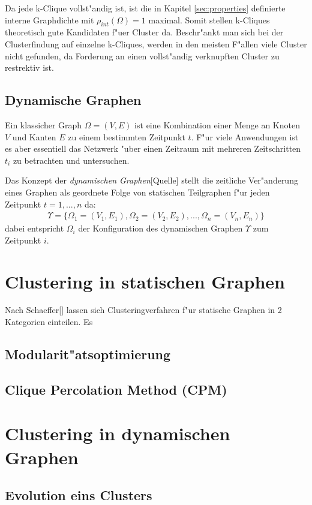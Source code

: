 \documentclass[journal]{vgtc}
\begin{document}
  	
  	Da jede k-Clique vollst"andig ist, ist die in Kapitel \ref{sec:properties} definierte
  	interne Graphdichte mit $\rho_{int}(\Omega)=1$ maximal. Somit stellen k-Cliques theoretisch gute 
  	Kandidaten f"uer Cluster da. Beschr"ankt man sich bei der Clusterfindung auf einzelne k-Cliques,
  	werden in den meisten F"allen viele Cluster nicht gefunden, da Forderung an einen vollst"andig
  	verknupften Cluster zu restrektiv ist.
    
  \subsection{Dynamische Graphen}
	Ein klassicher Graph $\Omega=(V,E)$ ist eine Kombination einer Menge an Knoten $V$ und
	Kanten $E$ zu einem bestimmten Zeitpunkt $t$. F"ur viele Anwendungen
	ist es aber essentiell das Netzwerk "uber einen Zeitraum mit mehreren Zeitschritten $t_i$ zu
	betrachten und untersuchen.
	
	Das Konzept der \emph{dynamischen Graphen}[Quelle] stellt die zeitliche Ver"anderung eines Graphen
	als geordnete Folge von statischen Teilgraphen f"ur jeden Zeitpunkt $t=1,...,n$ da:
	\begin{align}
		\Upsilon=\{\Omega_1=(V_1, E_1), \Omega_2=(V_2, E_2), ..., \Omega_n=(V_n,E_n)\}
	\end{align}
	dabei entspricht $\Omega_i$ der Konfiguration des dynamischen Graphen $\Upsilon$ zum Zeitpunkt $i$.
  
\section{Clustering in statischen Graphen}
  
  Nach Schaeffer[] lassen sich Clusteringverfahren f"ur statische Graphen in 2 Kategorien einteilen. Es
  
  \subsection{Modularit"atsoptimierung}
  \subsection{Clique Percolation Method (CPM)}

\section{Clustering in dynamischen Graphen}
  \subsection{Evolution eins Clusters}
\end{document}
